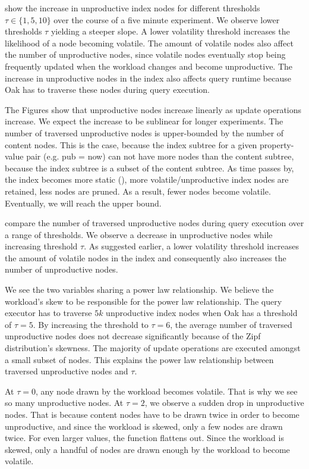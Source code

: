 \documentclass[abstracton,12pt]{scrartcl}
\theoremstyle{definition}
\begin{document}
show the increase in unproductive index nodes for different
thresholds $\tau \in \{1,5,10\}$ over the course of a five minute experiment.
We observe lower thresholds $\tau$ yielding a steeper slope.
A lower volatility threshold increases the likelihood of a node
becoming volatile. The amount of volatile nodes also affect the number of
unproductive nodes, since volatile nodes eventually stop being frequently
updated when the workload changes and become unproductive. 
The increase in unproductive nodes in the index
also affects query runtime because Oak has to traverse these nodes during
query execution.

The Figures show that unproductive nodes increase linearly as update operations
increase. We expect the increase to be sublinear for longer experiments.
The number of traversed unproductive nodes is upper-bounded by the number 
of content nodes.
This is the case, because the index subtree for a given property-value pair
(e.g. pub = now) can not have
more nodes than the content subtree, because the index subtree is a subset
of the content subtree.
As time passes by, the index becomes more static (), 
more volatile/unproductive
index nodes are retained, less nodes are pruned. As a result, fewer nodes
become volatile. Eventually, we will reach the upper bound.

 compare the
number of traversed unproductive nodes during query execution over a range of
thresholds. We observe a decrease in unproductive nodes while increasing
threshold $\tau$. 
As suggested earlier, a lower volatility threshold
increases the amount of volatile nodes in the index and consequently also
increases the number of unproductive nodes. 

We see the two variables sharing a power law relationship. We believe the
workload's skew to be responsible for the power law relationship. 
The query executor has to traverse $5k$ unproductive index nodes when Oak has a
threshold of $\tau = 5$. By increasing the threshold to $\tau = 6$, the average
number of traversed unproductive nodes does not decrease significantly because
of the Zipf distribution's skewness. The majority of update operations are executed
amongst a small subset of nodes. This explains the power law relationship
between traversed unproductive nodes and $\tau$.

At $\tau = 0$, any node drawn by the workload becomes volatile. That is why we
see so many unproductive nodes. At $\tau = 2$, we observe a sudden drop in 
unproductive nodes. That is because content nodes have to be drawn twice in order
to become unproductive, and since the workload is skewed, only a few nodes are
drawn twice. For even larger values, the function flattens out. Since the workload
is skewed, only a handful of nodes are drawn enough by the workload to become volatile.
\end{document}

